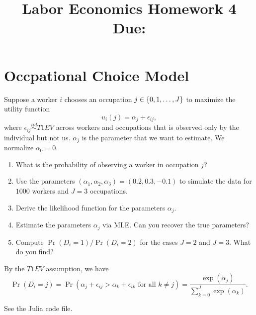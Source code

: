 \documentclass[12pt]{article}
\title{
    Labor Economics Homework 4 \\
    \large Due: \\
    }
\author{}
\date{}
\begin{document}
    

\maketitle
\vspace{-2cm}

\section{Occpational Choice Model}
Suppose a worker $i$ chooses an occupation $j\in\left\{ {0,1,\ldots,J} \right\}$ 
to maximize the utility function 
\begin{equation*}
    u_i(j) = \alpha_j + \epsilon_{ij},
\end{equation*}
where $\epsilon_{ij}\overset{iid}{\sim}T1EV$ across workers and occupations 
that is observed only by the individual but not us. $\alpha_j$ is the 
parameter that we want to estimate. We normalize $\alpha_0 = 0$.
\begin{enumerate}
    \item What is the probability of observing a worker in occupation $j$?
    \item Use the parameters $(\alpha_1, \alpha_2, \alpha_3) = (0.2, 0.3, -0.1)$ 
    to simulate the data for $1000$ workers and $J=3$ occupations.
    \item Derive the likelihood function for the parameters $\alpha_j$.
    \item Estimate the parameters $\alpha_j$ via MLE. Can you recover the true 
    parameters?
    \item Compute $\Pr(D_i = 1)/\Pr(D_i = 2)$ for the cases $J = 2$ and $J = 3$. 
    What do you find?
\end{enumerate}
\begin{sol}[1.1]
    By the $T1EV$ assumption, we have 
    \begin{equation*}
        \Pr(D_i = j) = \Pr(\alpha_j + \epsilon_{ij} > \alpha_k + \epsilon_{ik} \text{ for all } k\neq j) = \frac{\exp(\alpha_j)}{\sum_{k=0}^{J}\exp(\alpha_k)}.
    \end{equation*}
    \solend
\end{sol}
\begin{sol}[1.2, 1.4]
    See the Julia code file.
    \solend
\end{sol}
\end{document}

